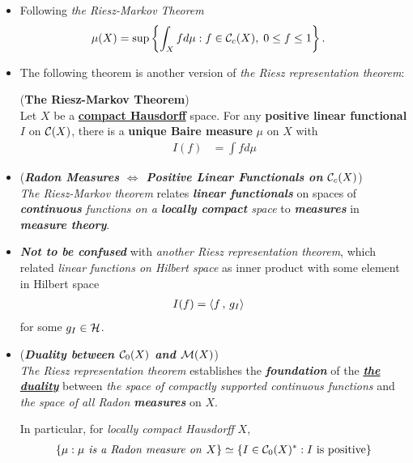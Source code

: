 \documentclass[11pt]{article}
\begin{document}
\begin{itemize}
\item \begin{remark}
Following \emph{the Riesz-Markov Theorem}
\begin{align*}
\mu(X) &= \sup\left\{\int_X f d\mu: f \in {\mathcal C}_c(X),  \; 0 \le f \le 1\right\}.
\end{align*}
\end{remark}

\item The following theorem is another version of \emph{the Riesz representation theorem}:
 \begin{theorem} (\textbf{The Riesz-Markov Theorem}) \citep{reed1980methods}\\
Let $X$ be a \underline{\textbf{compact Hausdorff}} space. For any \textbf{positive linear functional} $I$ on \underline{${\mathcal C}(X)$}, there is a \textbf{unique Baire measure} $\mu$ on $X$ with 
\begin{align*}
I(f) &= \int f d\mu 
\end{align*} 
\end{theorem}

\item \begin{remark} (\emph{\textbf{Radon Measures $\Leftrightarrow$ Positive Linear Functionals on ${\mathcal C}_c(X)$}})\\
\emph{The Riesz-Markov theorem} relates \emph{\textbf{linear functionals}} on spaces of \emph{\textbf{continuous} functions on a \textbf{locally compact} space} to \emph{\textbf{measures}} in \textbf{\emph{measure theory}}. 
\end{remark}

\item \begin{remark}
\emph{\textbf{Not to be confused}} with \emph{another Riesz representation theorem}, which related \emph{linear functions on Hilbert space} as inner product with some element in Hilbert space
\begin{align*}
I(f) &= \left\langle f\,,\, g_{I} \right\rangle
\end{align*} for some $g_{I} \in {\mathcal H}$.
\end{remark}

\item \begin{remark} (\emph{\textbf{Duality between ${\mathcal C}_{0}(X)$ and ${\mathcal M}(X)$}})\\
\emph{The Riesz representation theorem} establishes the \emph{\textbf{foundation}} of the \underline{\emph{\textbf{the duality}}} between \emph{the space of compactly supported continuous functions} and \emph{the space of all Radon \textbf{measures}} on $X$. 

In particular, for \emph{locally compact Hausdorff} $X$, 
\begin{align*}
\left\{\mu: \mu \text{\emph{ is a Radon measure on }}X\right\} \simeq \left\{I \in {\mathcal C}_{0}(X)^{*}: I \text{ is positive}\right\}
\end{align*}
\end{remark}
\end{itemize}
\end{document}
